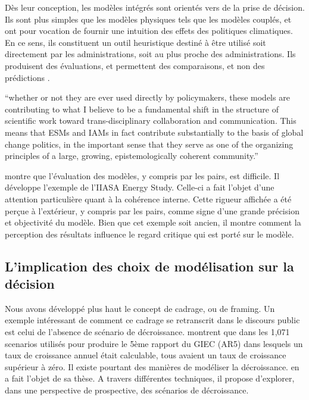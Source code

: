 
Dès leur conception, les modèles intégrés sont orientés vers de la prise de décision. Ils sont plus simples que les modèles physiques tels que les modèles couplés, et ont pour vocation de fournir une intuition des effets des politiques climatiques. En ce sens, ils constituent un outil heuristique destiné à être utilisé soit directement par les administrations, soit au plus proche des administrations. Ils produisent des évaluations, et permettent des comparaisons, et non des prédictions \autocite{edwards_global_1996}. 

\begin{authoredquote}
“whether or not they are ever used directly by policymakers, these models are contributing to what I believe to be a fundamental shift in the structure of scientific work toward trans-disciplinary collaboration and communication. This means that ESMs and IAMs in fact contribute substantially to the basis of global change politics, in the important sense that they serve as one of the organizing principles of a large, growing, epistemologically coherent community.” \\

    
\end{authoredquote}


\textcite{wynne_institutional_1984} montre que l'évaluation des modèles, y compris par les pairs, est difficile. Il développe l'exemple de l'IIASA Energy Study. Celle-ci a fait l'objet d'une attention particulière quant à la cohérence interne. Cette rigueur affichée a été perçue à l'extérieur, y compris par les pairs, comme signe d'une grande précision et objectivité du modèle.  Bien que cet exemple soit ancien, il montre comment la perception des résultats influence le regard critique qui est porté sur le modèle. 

\subsection{L'implication des choix de modélisation sur la décision}

Nous avons développé plus haut le concept de cadrage, ou de framing. Un exemple intéressant de comment ce cadrage se retranscrit dans le discours public est celui de l'absence de scénario de décroissance. \textcite{cointe_understanding_2023} montrent que dans les 1,071 scenarios utilisés pour produire le 5ème rapport du GIEC (AR5) dans lesquels un taux de croissance annuel était calculable, tous avaient un taux de croissance supérieur à zéro. 
Il existe pourtant des manières de modéliser la décroissance. \textcite{briens_decroissance_2015} en a fait l'objet de sa thèse. A travers différentes techniques, il propose d'explorer, dans une perspective de prospective, des scénarios de décroissance. 

